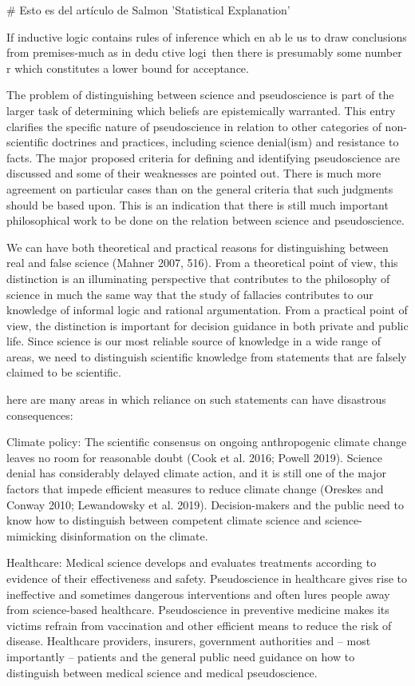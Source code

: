 # Esto es del artículo de Salmon 'Statistical Explanation'

If inductive logic contains rules of inference which en ab le us to draw
conclusions from premises-much as in dedu ctive logi~then there is presumably
some number r which constitutes a lower bound for acceptance.




The problem of distinguishing between science and pseudoscience is part of the
larger task of determining which beliefs are epistemically warranted. This entry
clarifies the specific nature of pseudoscience in relation to other categories
of non-scientific doctrines and practices, including science denial(ism) and
resistance to facts. The major proposed criteria for defining and identifying
pseudoscience are discussed and some of their weaknesses are pointed out. There
is much more agreement on particular cases than on the general criteria that
such judgments should be based upon. This is an indication that there is still
much important philosophical work to be done on the relation between science and
pseudoscience.

We can have both theoretical and practical reasons for distinguishing between
real and false science (Mahner 2007, 516). From a theoretical point of view,
this distinction is an illuminating perspective that contributes to the
philosophy of science in much the same way that the study of fallacies
contributes to our knowledge of informal logic and rational argumentation. From
a practical point of view, the distinction is important for decision guidance in
both private and public life. Since science is our most reliable source of
knowledge in a wide range of areas, we need to distinguish scientific knowledge
from statements that are falsely claimed to be scientific.


here are many areas in which reliance on such statements can have disastrous
consequences:

Climate policy: The scientific consensus on ongoing anthropogenic climate change
leaves no room for reasonable doubt (Cook et al. 2016; Powell 2019). Science
denial has considerably delayed climate action, and it is still one of the major
factors that impede efficient measures to reduce climate change (Oreskes and
Conway 2010; Lewandowsky et al. 2019). Decision-makers and the public need to
know how to distinguish between competent climate science and science-mimicking
disinformation on the climate.

Healthcare: Medical science develops and evaluates treatments according to
evidence of their effectiveness and safety. Pseudoscience in healthcare gives
rise to ineffective and sometimes dangerous interventions and often lures people
away from science-based healthcare. Pseudoscience in preventive medicine makes
its victims refrain from vaccination and other efficient means to reduce the
risk of disease. Healthcare providers, insurers, government authorities and –
most importantly – patients and the general public need guidance on how to
distinguish between medical science and medical pseudoscience.

